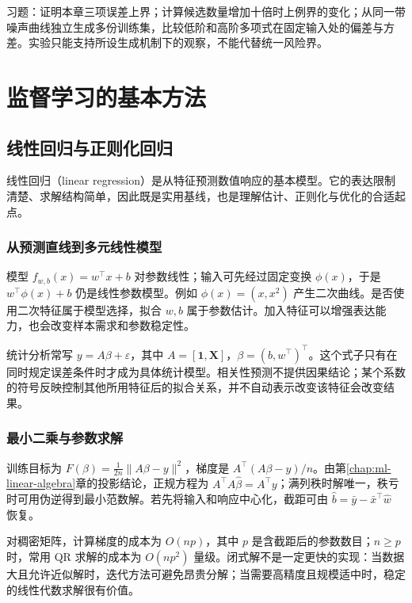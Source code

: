 \documentclass[UTF8,12pt,a4paper,fontset=fandol]{ctexbook}
\begin{document}
习题：证明本章三项误差上界；计算候选数量增加十倍时上例界的变化；从同一带噪声曲线独立生成多份训练集，比较低阶和高阶多项式在固定输入处的偏差与方差。实验只能支持所设生成机制下的观察，不能代替统一风险界。

\part{监督学习的基本方法}

\chapter{线性回归与正则化回归}
\label{chap:ml-regression}

线性回归（linear regression）是从特征预测数值响应的基本模型。它的表达限制清楚、求解结构简单，因此既是实用基线，也是理解估计、正则化与优化的合适起点。

\section{从预测直线到多元线性模型}

模型 $f_{w,b}(x)=w^\top x+b$ 对参数线性；输入可先经过固定变换 $\phi(x)$，于是 $w^\top\phi(x)+b$ 仍是线性参数模型。例如 $\phi(x)=(x,x^2)$ 产生二次曲线。是否使用二次特征属于模型选择，拟合 $w,b$ 属于参数估计。加入特征可以增强表达能力，也会改变样本需求和参数稳定性。

统计分析常写 $y=A\beta+\varepsilon$，其中 $A=[\mathbf1,\mathbf X]$，$\beta=(b,w^\top)^\top$。这个式子只有在同时规定误差条件时才成为具体统计模型。相关性预测不提供因果结论；某个系数的符号反映控制其他所用特征后的拟合关系，并不自动表示改变该特征会改变结果。

\section{最小二乘与参数求解}

训练目标为 $F(\beta)=\frac1{2n}\|A\beta-y\|^2$，梯度是 $A^\top(A\beta-y)/n$。由第\ref{chap:ml-linear-algebra}章的投影结论，正规方程为 $A^\top A\widehat\beta=A^\top y$；满列秩时解唯一，秩亏时可用伪逆得到最小范数解。若先将输入和响应中心化，截距可由 $\widehat b=\bar y-\bar x^\top\widehat w$ 恢复。

对稠密矩阵，计算梯度的成本为 $O(np)$，其中 $p$ 是含截距后的参数数目；$n\geq p$ 时，常用 QR 求解的成本为 $O(np^2)$ 量级。闭式解不是一定更快的实现：当数据大且允许近似解时，迭代方法可避免昂贵分解；当需要高精度且规模适中时，稳定的线性代数求解很有价值。
\end{document}
